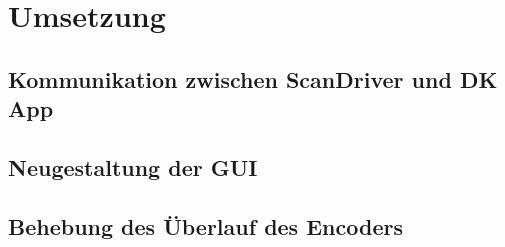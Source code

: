 \chapter{Umsetzung}
\doublespacing
\section{Kommunikation zwischen ScanDriver und DK App}
\section{Neugestaltung der GUI}
\section{Behebung des Überlauf des Encoders}
